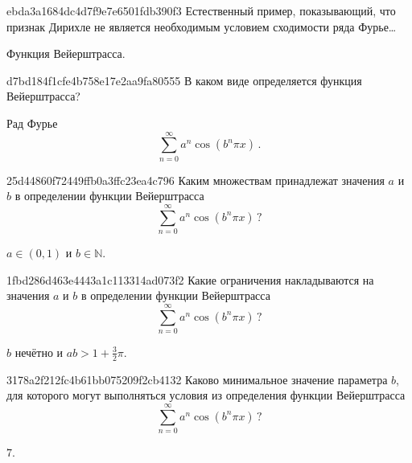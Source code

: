 \begin{note}{ebda3a1684dc4d7f9e7e6501fdb390f3}
    Естественный пример, показывающий, что признак Дирихле не является необходимым условием сходимости ряда Фурье\ldots

    \begin{cloze}{1}
        Функция Вейерштрасса.
    \end{cloze}
\end{note}

\begin{note}{d7bd184f1cfe4b758e17e2aa9fa80555}
    В каком виде определяется функция Вейерштрасса?

    \begin{cloze}{1}
        Рад Фурье
        \[
            \sum_{n=0}^{\infty} a^{n} \cos (b^{n} \pi x)\,.
        \]
    \end{cloze}
\end{note}

\begin{note}{25d44860f72449ffb0a3ffc23ea4c796}
    Каким множествам принадлежат значения \({ a }\) и \({ b }\) в определении функции Вейерштрасса
    \[
            \sum_{n=0}^{\infty} a^{n} \cos (b^{n} \pi x)\,?
    \]

    \begin{cloze}{1}
        \({ a \in (0, 1) }\) и \({ b \in \mathbb N }\).
    \end{cloze}
\end{note}

\begin{note}{1fbd286d463e4443a1c113314ad073f2}
    Какие ограничения накладываются на значения \({ a }\) и \({ b }\) в определении функции Вейерштрасса
    \[
            \sum_{n=0}^{\infty} a^{n} \cos (b^{n} \pi x)\,?
    \]

    \begin{cloze}{1}
        \({ b }\) нечётно и \({ ab > 1 + \frac{3}{2} \pi }\).
    \end{cloze}
\end{note}

\begin{note}{3178a2f212fc4b61bb075209f2cb4132}
    Каково минимальное значение параметра \({ b }\), для которого могут выполняться условия из определения функции Вейерштрасса
    \[
            \sum_{n=0}^{\infty} a^{n} \cos (b^{n} \pi x)\,?
    \]

    \begin{cloze}{1}
        \({ 7 }\).
    \end{cloze}
\end{note}

